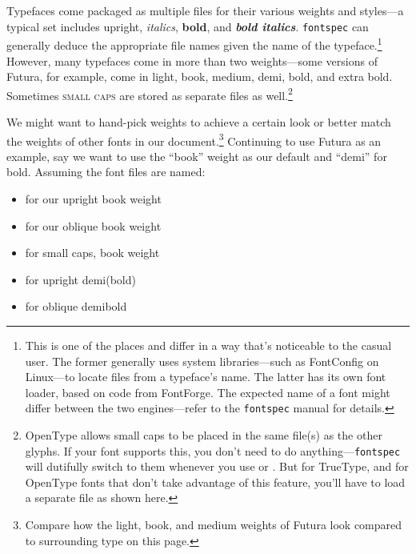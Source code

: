 Typefaces come packaged as multiple files for their various
weights and styles---a typical set includes upright,
\textit{italics},
\textbf{bold}, and
\textit{\textbf{bold italics}}.
\texttt{fontspec} can generally deduce the appropriate file
names given the name of the typeface.\punckern\footnote{This is
one of the places \XeLaTeX{} and \LuaLaTeX{}
differ in a way that's noticeable to the casual user.
The former generally uses system libraries---such as FontConfig on Linux---to
locate files from a typeface's name.
The latter has its own font loader,
based on code from FontForge.\punckern{}
The expected name of a font might differ between the two engines---refer
to the \texttt{fontspec} manual for details.}
However, many typefaces come in more than two weights---some versions of Futura,
for example, come in
{light},
{book},
{medium},
{demi},
{bold}, and
{extra bold}.
Sometimes
{\textsc{small caps}}
are stored as separate files as well.\punckern\footnote{OpenType allows
small caps to be placed in the same file(s) as the other glyphs.
If your font supports this, you don't need to do anything---\texttt{fontspec}
will dutifully switch to them whenever you use
 or .
But for TrueType, and for OpenType fonts that don't take advantage of this
feature, you'll have to load a separate file as shown here.}

We might want to hand-pick weights to achieve a certain look or better match the
weights of other fonts in our document.\punckern\footnote{Compare how
{the light,}
{book,}
{and medium weights}
of Futura look compared to surrounding type on this page.}
Continuing to use Futura as an example,
say we want to use the ``book'' weight as our default
and ``demi'' for bold.
Assuming the font files are named:
\begin{itemize}
\item {} for our
    {upright book weight}
\item {} for our
    {oblique book weight}
\item {} for
    {small caps, book weight}
\item {} for
    {upright demi(bold)}
\item {} for
    {oblique demibold}
\end{itemize}

